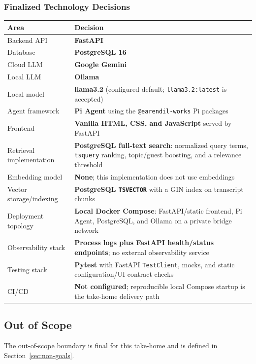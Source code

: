 \documentclass[11pt]{article}
\begin{document}
\subsubsection{Finalized Technology Decisions}
\begin{tabularx}{\textwidth}{@{}L{2.05in}Y@{}}
\toprule
\textbf{Area} & \textbf{Decision} \\
\midrule
Backend API & \textbf{FastAPI} \\
Database & \textbf{PostgreSQL 16} \\
Cloud LLM & \textbf{Google Gemini} \\
Local LLM & \textbf{Ollama} \\
Local model & \textbf{llama3.2} (configured default; \texttt{llama3.2:latest} is accepted) \\
Agent framework & \textbf{Pi Agent} using the \texttt{@earendil-works} Pi packages \\
Frontend & \textbf{Vanilla HTML, CSS, and JavaScript} served by FastAPI \\
Retrieval implementation & \textbf{PostgreSQL full-text search}: normalized query terms, \texttt{tsquery} ranking, topic/guest boosting, and a relevance threshold \\
Embedding model & \textbf{None}; this implementation does not use embeddings \\
Vector storage/indexing & \textbf{PostgreSQL \texttt{TSVECTOR}} with a GIN index on transcript chunks \\
Deployment topology & \textbf{Local Docker Compose}: FastAPI/static frontend, Pi Agent, PostgreSQL, and Ollama on a private bridge network \\
Observability stack & \textbf{Process logs plus FastAPI health/status endpoints}; no external observability service \\
Testing stack & \textbf{Pytest} with FastAPI \texttt{TestClient}, mocks, and static configuration/UI contract checks \\
CI/CD & \textbf{Not configured}; reproducible local Compose startup is the take-home delivery path \\
\bottomrule
\end{tabularx}

\subsection{Out of Scope}
The out-of-scope boundary is final for this take-home and is defined in Section~\ref{sec:non-goals}.
\end{document}
